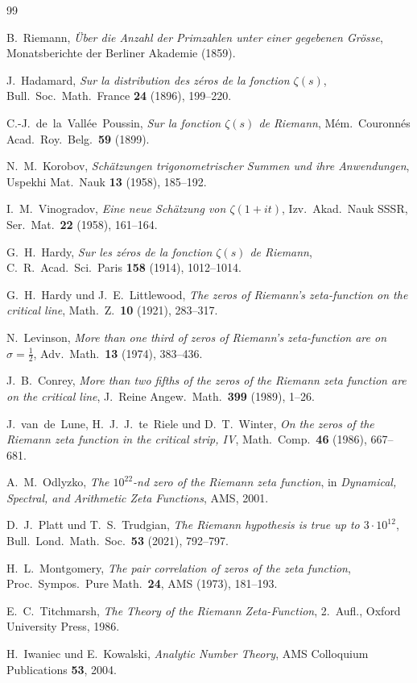 \documentclass[12pt,a4paper]{article}
\theoremstyle{remark}
\begin{document}
\begin{thebibliography}{99}

B.~Riemann,
\textit{Über die Anzahl der Primzahlen unter einer gegebenen Grösse},
Monatsberichte der Berliner Akademie (1859).

J.~Hadamard,
\textit{Sur la distribution des zéros de la fonction $\zeta(s)$},
Bull.\ Soc.\ Math.\ France \textbf{24} (1896), 199--220.

C.-J.~de~la~Vallée~Poussin,
\textit{Sur la fonction $\zeta(s)$ de Riemann},
Mém.\ Couronnés Acad.\ Roy.\ Belg.\ \textbf{59} (1899).

N.~M.~Korobov,
\textit{Schätzungen trigonometrischer Summen und ihre Anwendungen},
Uspekhi Mat.\ Nauk \textbf{13} (1958), 185--192.

I.~M.~Vinogradov,
\textit{Eine neue Schätzung von $\zeta(1+it)$},
Izv.\ Akad.\ Nauk SSSR, Ser.\ Mat.\ \textbf{22} (1958), 161--164.

G.~H.~Hardy,
\textit{Sur les zéros de la fonction $\zeta(s)$ de Riemann},
C.\ R.\ Acad.\ Sci.\ Paris \textbf{158} (1914), 1012--1014.

G.~H.~Hardy und J.~E.~Littlewood,
\textit{The zeros of Riemann's zeta-function on the critical line},
Math.\ Z.\ \textbf{10} (1921), 283--317.

N.~Levinson,
\textit{More than one third of zeros of Riemann's zeta-function are on $\sigma=\tfrac{1}{2}$},
Adv.\ Math.\ \textbf{13} (1974), 383--436.

J.~B.~Conrey,
\textit{More than two fifths of the zeros of the Riemann zeta function are on the critical line},
J.\ Reine Angew.\ Math.\ \textbf{399} (1989), 1--26.

J.~van~de~Lune, H.~J.~J.~te~Riele und D.~T.~Winter,
\textit{On the zeros of the Riemann zeta function in the critical strip, IV},
Math.\ Comp.\ \textbf{46} (1986), 667--681.

A.~M.~Odlyzko,
\textit{The $10^{22}$-nd zero of the Riemann zeta function},
in \textit{Dynamical, Spectral, and Arithmetic Zeta Functions}, AMS, 2001.

D.~J.~Platt und T.~S.~Trudgian,
\textit{The Riemann hypothesis is true up to $3\cdot10^{12}$},
Bull.\ Lond.\ Math.\ Soc.\ \textbf{53} (2021), 792--797.

H.~L.~Montgomery,
\textit{The pair correlation of zeros of the zeta function},
Proc.\ Sympos.\ Pure Math.\ \textbf{24}, AMS (1973), 181--193.

E.~C.~Titchmarsh,
\textit{The Theory of the Riemann Zeta-Function}, 2.~Aufl.,
Oxford University Press, 1986.

H.~Iwaniec und E.~Kowalski,
\textit{Analytic Number Theory},
AMS Colloquium Publications \textbf{53}, 2004.

\end{thebibliography}
\end{document}
